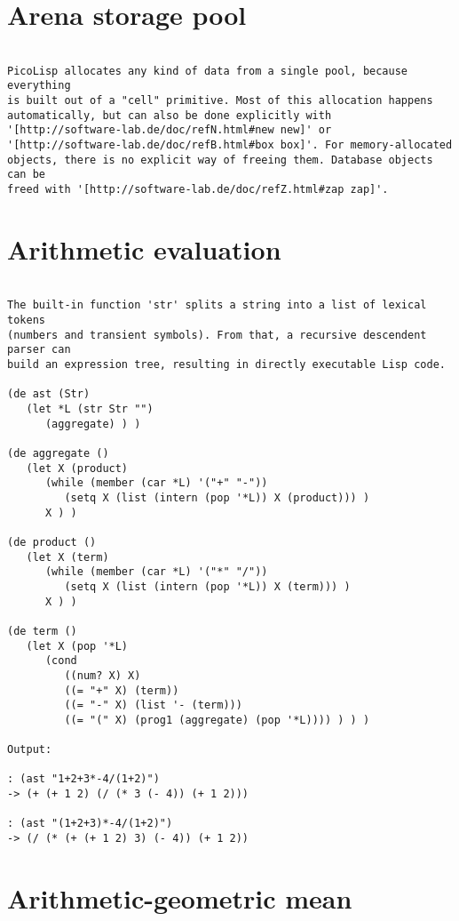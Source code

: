 \section*{Arena storage pool}

\begin{verbatim}

PicoLisp allocates any kind of data from a single pool, because everything
is built out of a "cell" primitive. Most of this allocation happens
automatically, but can also be done explicitly with
'[http://software-lab.de/doc/refN.html#new new]' or
'[http://software-lab.de/doc/refB.html#box box]'. For memory-allocated
objects, there is no explicit way of freeing them. Database objects can be
freed with '[http://software-lab.de/doc/refZ.html#zap zap]'.

\end{verbatim}

\section*{Arithmetic evaluation}

\begin{verbatim}

The built-in function 'str' splits a string into a list of lexical tokens
(numbers and transient symbols). From that, a recursive descendent parser can
build an expression tree, resulting in directly executable Lisp code.

(de ast (Str)
   (let *L (str Str "")
      (aggregate) ) )

(de aggregate ()
   (let X (product)
      (while (member (car *L) '("+" "-"))
         (setq X (list (intern (pop '*L)) X (product))) )
      X ) )

(de product ()
   (let X (term)
      (while (member (car *L) '("*" "/"))
         (setq X (list (intern (pop '*L)) X (term))) )
      X ) )

(de term ()
   (let X (pop '*L)
      (cond
         ((num? X) X)
         ((= "+" X) (term))
         ((= "-" X) (list '- (term)))
         ((= "(" X) (prog1 (aggregate) (pop '*L)))) ) ) )

Output:

: (ast "1+2+3*-4/(1+2)")
-> (+ (+ 1 2) (/ (* 3 (- 4)) (+ 1 2)))

: (ast "(1+2+3)*-4/(1+2)")
-> (/ (* (+ (+ 1 2) 3) (- 4)) (+ 1 2))

\end{verbatim}

\section*{Arithmetic-geometric mean}

